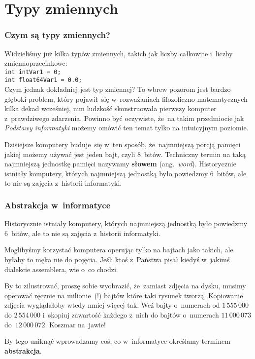 \documentclass[10pt,t]{beamer}
\begin{document}
\section{Typy zmiennych}


\begin{frame}
  \frametitle{Czym są typy zmiennych?}


  Widzieliśmy już kilka typów zmiennych, takich jak liczby całkowite
  i~liczby zmiennoprzecinkowe: \\
  \texttt{int intVar1 = 0;} \\
  \texttt{int float64Var1 = 0.0;} \\
  Czym jednak dokładniej jest typ zmiennej? To wbrew pozorom jest bardzo
  głęboki problem, który pojawił~się w~rozważaniach
  filozoficzno-matematycznych kilka dekad wcześniej, nim ludzkość
  skonstruowała pierwszy komputer z~prawdziwego zdarzenia. Powinno być
  oczywiste, że~na takim przedmiocie jak \textit{Podstawy informatyki}
  możemy omówić ten temat tylko na intuicyjnym poziomie.

  Dzisiejsze komputery buduje~się w~ten sposób, że~najmniejszą porcją pamięci
  jakiej możemy używać jest jeden bajt, czyli $8$~bitów. Techniczny
  termin na taką najmniejszą jednostkę pamięci nazywamy
  \textbf{słowem} (ang.~\textit{word}). Historycznie istniały komputery,
  których najmniejszą jednostką było powiedzmy $6$~bitów, ale to nie są
  zajęcia z~historii informatyki.

\end{frame}





\begin{frame}
  \frametitle{Abstrakcja w~informatyce}


  Historycznie istniały komputery, których najmniejszą jednostką było
  powiedzmy $6$~bitów, ale to nie są zajęcia z~historii informatyki.

  Moglibyśmy korzystać komputera operując tylko na bajtach jako takich,
  ale byłaby to męka nie do pojęcia. Jeśli ktoś z~Państwa pisał kiedyś
  w~jakimś dialekcie assemblera, wie o~co chodzi.

  By to zilustrować, proszę sobie wyobrazić, że~zamiast zdjęcia na dysku,
  musimy operować ręcznie na milionie~(!) bajtów które taki rysunek tworzą.
  Kopiowanie zdjęcia wyglądałoby wtedy mniej więcej tak. Weź bajty
  o~numerach od $1 \, 555 \, 000$ do $2 \, 554 \, 000$ i~skopiuj
  zawartość każdego z~nich do bajtów o~numerach $11 \, 000 \, 073$
  do~$12 \, 000 \, 072$. Koszmar na~jawie!

  By tego uniknąć wprowadzamy coś, co w~informatyce określamy terminem
  \textbf{abstrakcja}.

\end{frame}
\end{document}
